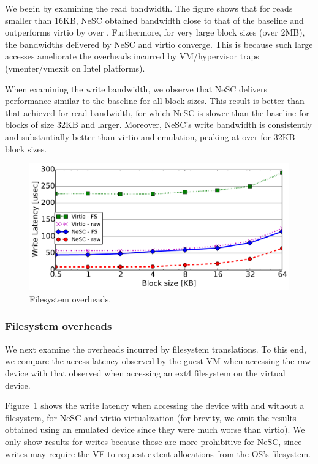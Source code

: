 We begin by examining the read bandwidth.
%
The figure shows that for reads smaller than 16KB, NeSC obtained bandwidth close to that of the baseline and outperforms virtio by over .
%
Furthermore, for very large block sizes (over 2MB), the bandwidths delivered by NeSC and virtio converge. This is because such large accesses ameliorate the overheads incurred by VM/hypervisor traps (vmenter/vmexit on Intel platforms).

When examining the write bandwidth, we observe that NeSC delivers performance similar to the baseline for all block sizes. This result is better than that achieved for read bandwidth, for which NeSC is \tilde{} slower than  the baseline for blocks of size 32KB and larger. Moreover, NeSC's write bandwidth is consistently and substantially better than virtio and emulation, peaking at over  for 32KB block sizes.


\begin{figure}[t]
  \centering
  \includegraphics[width=1\columnwidth]{figs/fs_affect.pdf}
  \caption{Filesystem overheads.}
  \label{fig:fs_effect}
\end{figure}

\subsubsection*{\bf Filesystem overheads}
We next examine the overheads incurred by filesystem translations. To this end, we compare the access latency observed by the guest VM when accessing the raw device with that observed when accessing an ext4 filesystem on the virtual device.

Figure~\ref{fig:fs_effect} shows the write latency when accessing the device with and without a filesystem, for NeSC and virtio virtualization (for brevity, we omit the results obtained using an emulated device since they were much worse than virtio). We only show results for writes because those are more prohibitive for NeSC, since writes may require the VF to request extent allocations from the OS's filesystem.

